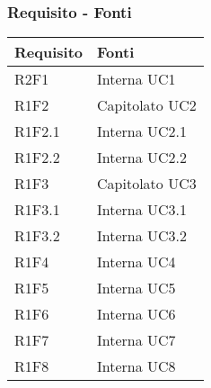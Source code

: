 \subsubsection{Requisito - Fonti}
\begin{center}
	\begin{longtable}{|p{22mm}|p{44mm}|}
		\hline
		\rowcolor{lighter-grayer}
		\textbf{Requisito} &  \textbf{Fonti}  \\
		\hline
		\endhead
		


 R2F1 &
Interna \newline
UC1 
\\
\hline

R1F2 &
Capitolato \newline
UC2 
\\
\hline

R1F2.1 &
Interna \newline
UC2.1 
\\
\hline

R1F2.2 &
Interna \newline
UC2.2 
\\
\hline

R1F3 &
Capitolato \newline
UC3 
\\
\hline

R1F3.1 &
Interna \newline
UC3.1 
\\
\hline

R1F3.2 &
Interna \newline
UC3.2 
\\
\hline

R1F4 &
Interna \newline
UC4 
\\
\hline

R1F5 &
Interna \newline
UC5 
\\
\hline

R1F6 &
Interna \newline
UC6 
\\
\hline

R1F7 &
Interna \newline
UC7 
\\
\hline

R1F8 &
Interna \newline
UC8 
\\
\hline


\end{longtable}
\end{center}
